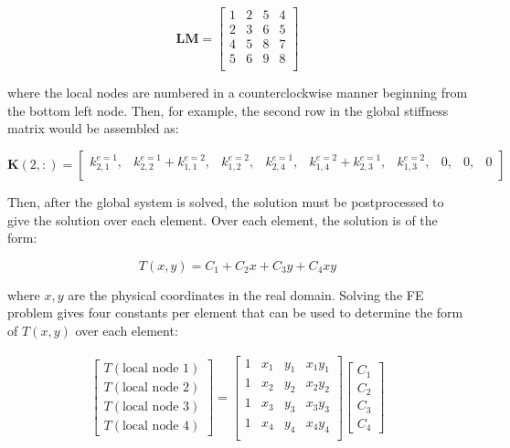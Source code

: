 \documentclass[10pt]{article}
\begin{document}
\begin{equation}
\textbf{LM}=\begin{bmatrix}
1 & 2 & 5 & 4\\
2 & 3 & 6 & 5\\
4 & 5 & 8 & 7\\
5 & 6 & 9 & 8\\
\end{bmatrix}
\end{equation}

where the local nodes are numbered in a counterclockwise manner beginning from the bottom left node. Then, for example, the second row in the global stiffness matrix would be assembled as:

\begin{equation}
\textbf{K}(2,:)=\begin{bmatrix}
k_{2,1}^{e=1}, & k_{2,2}^{e=1}+k_{1,1}^{e=2}, & k_{1,2}^{e=2}, & k_{2,4}^{e=1}, & k_{1,4}^{e=2}+k_{2,3}^{e=1}, & k_{1,3}^{e=2}, & 0, & 0, & 0\\
\end{bmatrix}
\end{equation}

Then, after the global system is solved, the solution must be postprocessed to give the solution over each element. Over each element, the solution is of the form:

\begin{equation}
T(x,y)=C_1+C_2x+C_3y+C_4xy
\end{equation}

where \(x,y\) are the physical coordinates in the real domain. Solving the FE problem gives four constants per element that can be used to determine the form of \(T(x,y)\) over each element:

\begin{equation}
\begin{aligned}
\begin{bmatrix}
T(\text{local node 1})\\T(\text{local node 2})\\T(\text{local node 3})\\T(\text{local node 4})
\end{bmatrix}=\begin{bmatrix}
1 & x_1 & y_1 & x_1y_1\\
1 & x_2 & y_2 & x_2y_2\\
1 & x_3 & y_3 & x_3y_3\\
1 & x_4 & y_4 & x_4y_4\\
\end{bmatrix}
\begin{bmatrix}
C_1\\C_2\\C_3\\C_4
\end{bmatrix}
\end{aligned}
\end{equation}
\end{document}
